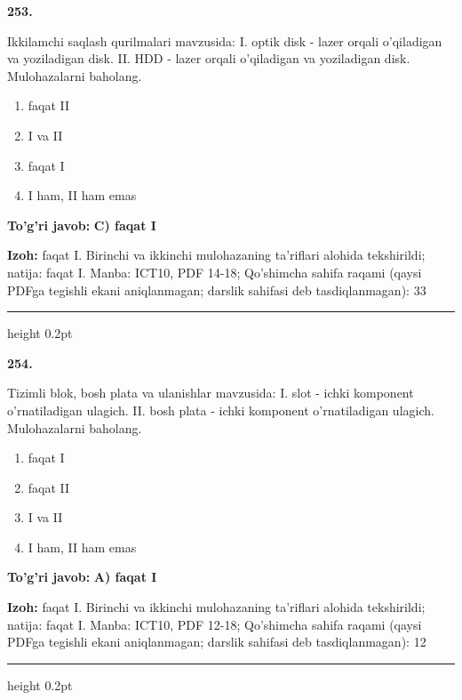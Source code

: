 \documentclass[10pt,a4paper]{article}
\begin{document}
{\bfseries\sffamily\color{ink} 253.}
\par
Ikkilamchi saqlash qurilmalari mavzusida: I. optik disk - lazer orqali o'qiladigan va yoziladigan disk. II. HDD - lazer orqali o'qiladigan va yoziladigan disk. Mulohazalarni baholang.
\begin{enumerate}[label=\Alph*),leftmargin=9mm]
\item faqat II
\item I va II
\item faqat I
\item I ham, II ham emas
\end{enumerate}
\begin{tcolorbox}[enhanced,breakable,colback=teal!4,colframe=teal!60!black,boxrule=0.45pt,arc=1.2mm,left=2.7mm,right=2.7mm,top=1.8mm,bottom=1.8mm,before skip=2mm,after skip=2mm]
{\bfseries\sffamily\color{teal}To'g'ri javob:} \textbf{C) faqat I}
\par\smallskip
{\bfseries Izoh:} faqat I. Birinchi va ikkinchi mulohazaning ta'riflari alohida tekshirildi; natija: faqat I. Manba: ICT10, PDF 14-18; Qo'shimcha sahifa raqami (qaysi PDFga tegishli ekani aniqlanmagan; darslik sahifasi deb tasdiqlanmagan): 33
\end{tcolorbox}
\vspace{2mm}\hrule height 0.2pt\vspace{3mm}

{\bfseries\sffamily\color{ink} 254.}
\par
Tizimli blok, bosh plata va ulanishlar mavzusida: I. slot - ichki komponent o'rnatiladigan ulagich. II. bosh plata - ichki komponent o'rnatiladigan ulagich. Mulohazalarni baholang.
\begin{enumerate}[label=\Alph*),leftmargin=9mm]
\item faqat I
\item faqat II
\item I va II
\item I ham, II ham emas
\end{enumerate}
\begin{tcolorbox}[enhanced,breakable,colback=teal!4,colframe=teal!60!black,boxrule=0.45pt,arc=1.2mm,left=2.7mm,right=2.7mm,top=1.8mm,bottom=1.8mm,before skip=2mm,after skip=2mm]
{\bfseries\sffamily\color{teal}To'g'ri javob:} \textbf{A) faqat I}
\par\smallskip
{\bfseries Izoh:} faqat I. Birinchi va ikkinchi mulohazaning ta'riflari alohida tekshirildi; natija: faqat I. Manba: ICT10, PDF 12-18; Qo'shimcha sahifa raqami (qaysi PDFga tegishli ekani aniqlanmagan; darslik sahifasi deb tasdiqlanmagan): 12
\end{tcolorbox}
\vspace{2mm}\hrule height 0.2pt\vspace{3mm}
\end{document}
